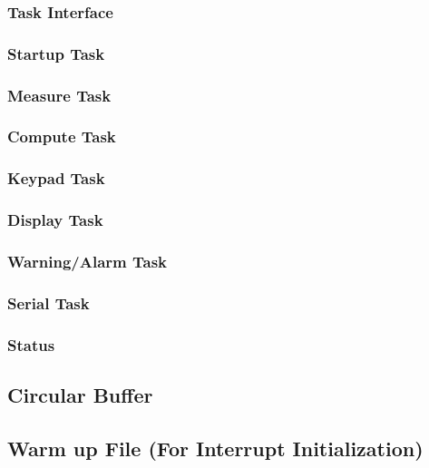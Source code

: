 \documentclass[12pt]{article} %
\begin{document}
    \subsubsection{Task Interface}
    

    \subsubsection{Startup Task}
    
    

    \subsubsection{Measure Task}
    
    

    \subsubsection{Compute Task}
    
    

    \subsubsection{Keypad Task}
    
    

    \subsubsection{Display Task}
    
    

    \subsubsection{Warning/Alarm Task}
    
    

    \subsubsection{Serial Task}
    
    

    \subsubsection{Status}
    
    

    \subsection{Circular Buffer}
    
    

    \subsection{Warm up File (For Interrupt Initialization)}
    

    
\end{document}
